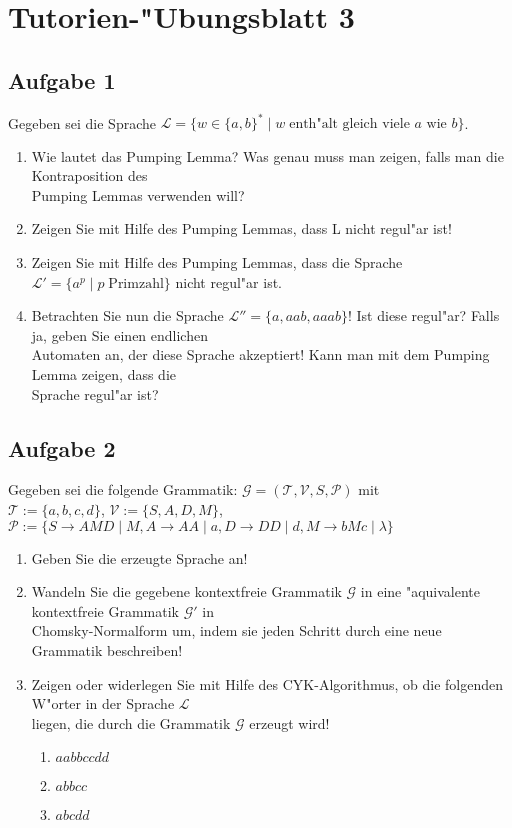 \documentclass[10pt,oneside,onecolumn,a4paper,german,titlepage]{article}
\begin{document}
\section*{Tutorien-"Ubungsblatt 3}

\subsection*{Aufgabe 1}
Gegeben sei die Sprache $\mathcal{L} = \{w \in \{a,b\}^* \; | \; w \;
\mbox{enth"alt gleich viele $a$ wie $b$}\}$.
\begin{enumerate}
\item Wie lautet das Pumping Lemma? Was genau muss man zeigen, falls man die
Kontraposition des\\
Pumping Lemmas verwenden will?
\item Zeigen Sie mit Hilfe des Pumping Lemmas, dass L nicht regul"ar ist!
\item Zeigen Sie mit Hilfe des Pumping Lemmas, dass die Sprache $\mathcal{L}' =
\{a^p\; | \; p \; \mbox{Primzahl}\}$ nicht regul"ar ist.
\item Betrachten Sie nun die Sprache $\mathcal{L}'' = \{a,aab,aaab\}$! Ist diese
regul"ar? Falls ja, geben Sie einen endlichen\\
Automaten an, der diese Sprache akzeptiert! Kann man mit dem Pumping Lemma zeigen,
dass die\\
Sprache regul"ar ist?
\end{enumerate}

\subsection*{Aufgabe 2}
Gegeben sei die folgende Grammatik: $\mathcal{G} = (\mathcal{T},\mathcal{V},S,
\mathcal{P})$ mit\\
$\mathcal{T} := \{a,b,c,d\}$, $\mathcal{V} := \{S,A,D,M\}$, $\mathcal{P} := \{
S \rightarrow AMD \; | \; M, A \rightarrow AA \; | \; a, D \rightarrow DD \; | \; d,
M \rightarrow bMc \; | \; \lambda\}$
\begin{enumerate}
\item Geben Sie die erzeugte Sprache an!
\item Wandeln Sie die gegebene kontextfreie Grammatik $\mathcal{G}$ in eine
"aquivalente kontextfreie Grammatik $\mathcal{G}'$ in\\
Chomsky-Normalform um, indem sie jeden Schritt durch eine neue Grammatik beschreiben!
\item Zeigen oder widerlegen Sie mit Hilfe des CYK-Algorithmus, ob die folgenden
W"orter in der Sprache $\mathcal{L}$\\
liegen, die durch die Grammatik $\mathcal{G}$ erzeugt wird!
\begin{enumerate}
\item $aabbccdd$
\item $abbcc$
\item $abcdd$
\end{enumerate}
\end{enumerate}
\end{document}
